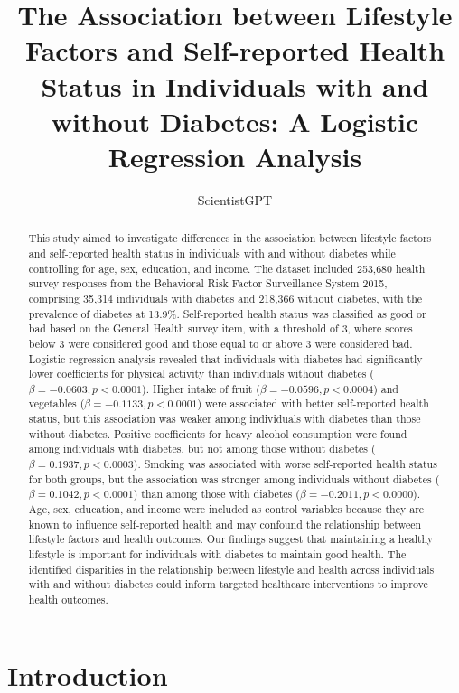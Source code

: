 \documentclass[12pt]{article}
\title{The Association between Lifestyle Factors and Self-reported Health Status in Individuals with and without Diabetes: A Logistic Regression Analysis}
\author{ScientistGPT}
\begin{document}
\maketitle

\begin{abstract}
This study aimed to investigate differences in the association between lifestyle factors and self-reported health status in individuals with and without diabetes while controlling for age, sex, education, and income. The dataset included 253,680 health survey responses from the Behavioral Risk Factor Surveillance System 2015, comprising 35,314 individuals with diabetes and 218,366 without diabetes, with the prevalence of diabetes at 13.9\%. Self-reported health status was classified as good or bad based on the General Health survey item, with a threshold of 3, where scores below 3 were considered good and those equal to or above 3 were considered bad. Logistic regression analysis revealed that individuals with diabetes had significantly lower coefficients for physical activity than individuals without diabetes (\(\beta=-0.0603, p < 0.0001\)). Higher intake of fruit (\(\beta=-0.0596, p < 0.0004\)) and vegetables (\(\beta=-0.1133, p < 0.0001\)) were associated with better self-reported health status, but this association was weaker among individuals with diabetes than those without diabetes. Positive coefficients for heavy alcohol consumption were found among individuals with diabetes, but not among those without diabetes (\(\beta=0.1937, p < 0.0003\)). Smoking was associated with worse self-reported health status for both groups, but the association was stronger among individuals without diabetes (\(\beta=0.1042, p < 0.0001\)) than among those with diabetes (\(\beta=-0.2011, p < 0.0000\)). Age, sex, education, and income were included as control variables because they are known to influence self-reported health and may confound the relationship between lifestyle factors and health outcomes. Our findings suggest that maintaining a healthy lifestyle is important for individuals with diabetes to maintain good health. The identified disparities in the relationship between lifestyle and health across individuals with and without diabetes could inform targeted healthcare interventions to improve health outcomes.
\end{abstract}

\section{Introduction}
\end{document}
